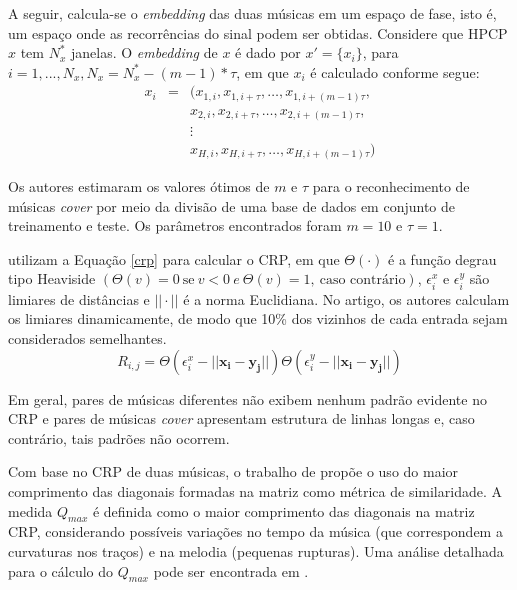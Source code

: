 A seguir, calcula-se o \textit{embedding} das duas músicas em um espaço de fase, isto é, um espaço onde as recorrências do sinal podem ser obtidas. Considere que  HPCP \textbf{\({x}\)} tem \({N_{x}^{*}}\) janelas. O \textit{embedding} de \textbf{\({x}\)} é dado por \({x' = \big\{x_{i}\big\}}\), para \({i = 1, ..., N_{x}, N_{x} = N_{x}^{*} - (m - 1)*\tau}\), em que \({x_{i}}\) é calculado conforme segue:
\begin{eqnarray} \label{embedding}
    x_{i} &=& (x_{1,i},x_{1,i+\tau}, \ldots, x_{1,i+(m-1)\tau}, \\
          & & x_{2,i},x_{2,i+\tau}, \ldots, x_{2,i+(m-1)\tau}, \nonumber \\
          & & \vdots \nonumber \\
          & & x_{H,i},x_{H,i+\tau}, \ldots, x_{H,i+(m-1)\tau}) \nonumber
\end{eqnarray}

Os autores estimaram os valores ótimos de \({m}\) e \({\tau}\) para o reconhecimento de músicas \textit{cover} por meio da divisão de uma base de dados em conjunto de treinamento e teste. Os parâmetros encontrados foram \({m = 10}\) e \({\tau = 1}\).

 utilizam a Equação \ref{crp} para calcular o CRP, em que \({\Theta(\cdot)}\) é a função degrau tipo Heaviside \({(\Theta(v) = 0 \ \textrm{se} \ v < 0 \  e \  \Theta(v) = 1, \ \textrm{caso contrário})}\), \({\epsilon_{i}^{x}}\) e \({\epsilon_{i}^{y}}\) são limiares de distâncias e \({|| \cdot ||}\) é a norma Euclidiana. No artigo, os autores calculam os limiares dinamicamente, de modo que 10\% dos vizinhos de cada entrada sejam considerados semelhantes.
\begin{equation} \label{crp}
    R_{i,j} = \Theta(\epsilon_{i}^{x} - ||\mathbf{x_{i} - y_{j}}||)\Theta(\epsilon_{i}^{y} - ||\mathbf{x_{i} - y_{j}}||)
\end{equation}

Em geral, pares de músicas diferentes não exibem nenhum padrão evidente no CRP e pares de músicas \textit{cover} apresentam estrutura de linhas longas e, caso contrário, tais padrões não ocorrem.

Com base no CRP de duas músicas, o trabalho de  propõe o uso do maior comprimento das diagonais formadas na matriz como métrica de similaridade. A medida \({Q_{max}}\) é definida como o maior comprimento das diagonais na matriz CRP, considerando possíveis variações no tempo da música (que correspondem a curvaturas nos traços) e na melodia (pequenas rupturas). Uma análise detalhada para o cálculo do \({Q_{max}}\) pode ser encontrada em \cite{serra2009}.

